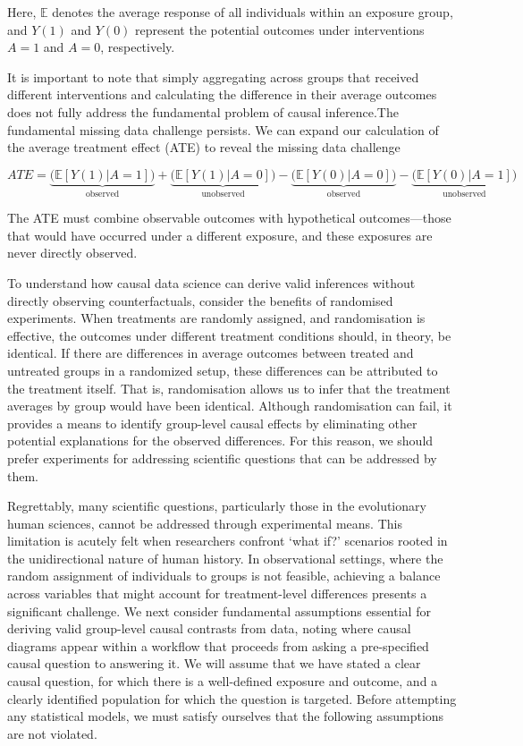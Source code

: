 \documentclass[
  singlecolumn,
  9pt]{article}
\begin{document}
Here, \(\mathbb{E}\) denotes the average response of all individuals
within an exposure group, and \(Y(1)\) and \(Y(0)\) represent the
potential outcomes under interventions \(A = 1\) and \(A = 0\),
respectively.

It is important to note that simply aggregating across groups that
received different interventions and calculating the difference in their
average outcomes does not fully address the fundamental problem of
causal inference.The fundamental missing data challenge persists. We can
expand our calculation of the average treatment effect (ATE) to reveal
the missing data challenge

\[
ATE = \underbrace{\big(\mathbb{E}[Y(1)|A = 1]\big)}_{\text{observed}}  + \underbrace{\big(\mathbb{E}[Y(1)|A = 0]\big)}_{\text{unobserved}} - \underbrace{\big(\mathbb{E}[Y(0)|A = 0]\big)}_{\text{observed}} - \underbrace{\big(\mathbb{E}[Y(0)|A = 1]\big)}_{\text{unobserved}}
\]

The ATE must combine observable outcomes with hypothetical
outcomes---those that would have occurred under a different exposure,
and these exposures are never directly observed.

To understand how causal data science can derive valid inferences
without directly observing counterfactuals, consider the benefits of
randomised experiments. When treatments are randomly assigned, and
randomisation is effective, the outcomes under different treatment
conditions should, in theory, be identical. If there are differences in
average outcomes between treated and untreated groups in a randomized
setup, these differences can be attributed to the treatment itself. That
is, randomisation allows us to infer that the treatment averages by
group would have been identical. Although randomisation can fail, it
provides a means to identify group-level causal effects by eliminating
other potential explanations for the observed differences. For this
reason, we should prefer experiments for addressing scientific questions
that can be addressed by them.

Regrettably, many scientific questions, particularly those in the
evolutionary human sciences, cannot be addressed through experimental
means. This limitation is acutely felt when researchers confront `what
if?' scenarios rooted in the unidirectional nature of human history. In
observational settings, where the random assignment of individuals to
groups is not feasible, achieving a balance across variables that might
account for treatment-level differences presents a significant
challenge. We next consider fundamental assumptions essential for
deriving valid group-level causal contrasts from data, noting where
causal diagrams appear within a workflow that proceeds from asking a
pre-specified causal question to answering it. We will assume that we
have stated a clear causal question, for which there is a well-defined
exposure and outcome, and a clearly identified population for which the
question is targeted. Before attempting any statistical models, we must
satisfy ourselves that the following assumptions are not violated.
\end{document}
